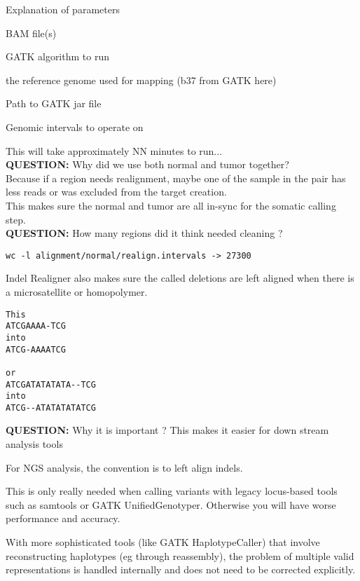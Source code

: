 \begin{note}
Explanation of parameters
\begin{description}[style=multiline,labelindent=0cm,align=right,leftmargin=\descriptionlabelspace,rightmargin=1.5cm,font=\ttfamily]
 \item[-I] BAM file(s)
 \item[-T] GATK algorithm to run
 \item[-R] the reference genome used for mapping (b37 from GATK here)
 \item[-jar] Path to GATK jar file
 \item[-L] Genomic intervals to operate on
\end{description}
\end{note}

This will take approximately NN minutes to run... \\

\textbf{QUESTION:} Why did we use both normal and tumor together? \\

Because if a region needs realignment, maybe one of the sample in the pair has less reads or was excluded from the target creation. \\
This makes sure the normal and tumor are all in-sync for the somatic calling step. \\

\textbf{QUESTION:} How many regions did it think needed cleaning ?
\begin{lstlisting}
wc -l alignment/normal/realign.intervals -> 27300
\end{lstlisting}

Indel Realigner also makes sure the called deletions are left aligned when there is a microsatellite or homopolymer.

\begin{verbatim}
This
ATCGAAAA-TCG
into
ATCG-AAAATCG

or
ATCGATATATATA--TCG
into
ATCG--ATATATATATCG
\end{verbatim}


\textbf{QUESTION:} Why it is important ?
This makes it easier for down stream analysis tools

For NGS analysis, the convention is to left align indels. 

This is only really needed when calling variants with legacy locus-based tools such as samtools or GATK UnifiedGenotyper. Otherwise you will have worse performance and accuracy.

With more sophisticated tools (like GATK HaplotypeCaller) that involve reconstructing haplotypes (eg through reassembly), the problem of multiple valid representations is handled internally and does not need to be corrected explicitly.

